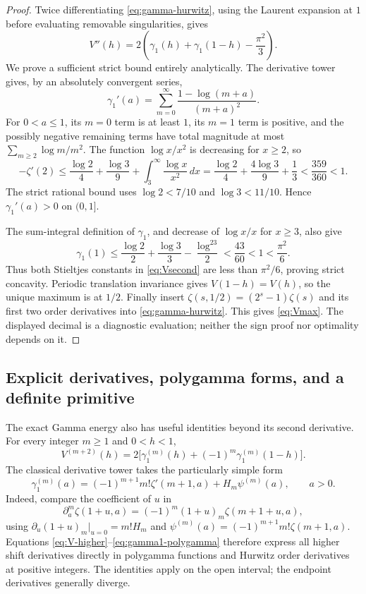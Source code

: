\begin{proof}
Twice differentiating \eqref{eq:gamma-hurwitz}, using the Laurent
expansion at $1$ before evaluating removable singularities, gives
\begin{equation}\label{eq:Vsecond}
 V''(h)=2\left(\gamma_1(h)+\gamma_1(1-h)-\frac{\pi^2}{3}\right).
\end{equation}
We prove a sufficient strict bound entirely analytically. The derivative
tower gives, by an absolutely convergent series,
\[
 \gamma_1'(a)=\sum_{m=0}^{\infty}
                 \frac{1-\log(m+a)}{(m+a)^2}.
\]
For $0<a\leq1$, its $m=0$ term is at least $1$, its $m=1$ term is
positive, and the possibly negative remaining terms have total magnitude
at most $\sum_{m\geq2}\log m/m^2$. The function $\log x/x^2$
is decreasing for $x\geq2$, so
\[
 -\zeta'(2)
 \leq\frac{\log2}{4}+\frac{\log3}{9}
         +\int_3^\infty\frac{\log x}{x^2}\,dx
 =\frac{\log2}{4}+\frac{4\log3}{9}+\frac13
 <\frac{359}{360}<1.
\]
The strict rational bound uses $\log2<7/10$ and $\log3<11/10$.
Hence $\gamma_1'(a)>0$ on $(0,1]$.

The sum-integral definition of $\gamma_1$, and decrease of
$\log x/x$ for $x\geq3$, also give
\[
 \gamma_1(1)
 \leq\frac{\log2}{2}+\frac{\log3}{3}
                         -\frac{\log^23}{2}
 <\frac{43}{60}<1<\frac{\pi^2}{6}.
\]
Thus both Stieltjes constants in \eqref{eq:Vsecond} are less than
$\pi^2/6$, proving strict concavity. Periodic translation invariance
gives $V(1-h)=V(h)$, so the unique maximum is at $1/2$.
Finally insert $\zeta(s,1/2)=(2^s-1)\zeta(s)$ and its first two
order derivatives into \eqref{eq:gamma-hurwitz}. This gives
\eqref{eq:Vmax}. The displayed decimal is a diagnostic evaluation;
neither the sign proof nor optimality depends on it.
\end{proof}

\subsection{Explicit derivatives, polygamma forms, and a definite primitive}

The exact Gamma energy also has useful identities beyond its second
derivative. For every integer $m\geq1$ and $0<h<1$,
\begin{equation}\label{eq:V-higher}
 V^{(m+2)}(h)=2\bigl[\gamma_1^{(m)}(h)
                         +(-1)^m\gamma_1^{(m)}(1-h)\bigr].
\end{equation}
The classical derivative tower takes the particularly simple form
\begin{equation}\label{eq:gamma1-polygamma}
 \gamma_1^{(m)}(a)=(-1)^{m+1}m!\zeta'(m+1,a)
                         +H_m\psi^{(m)}(a),\qquad a>0.
\end{equation}
Indeed, compare the coefficient of $u$ in
\[
 \partial_a^m\zeta(1+u,a)
 =(-1)^m(1+u)_m\zeta(m+1+u,a),
\]
using $\partial_u(1+u)_m|_{u=0}=m!H_m$ and
$\psi^{(m)}(a)=(-1)^{m+1}m!\zeta(m+1,a)$.
Equations \eqref{eq:V-higher}--\eqref{eq:gamma1-polygamma}
therefore express all higher shift derivatives directly in polygamma
functions and Hurwitz order derivatives at positive integers. The
identities apply on the open interval; the endpoint derivatives
generally diverge.

